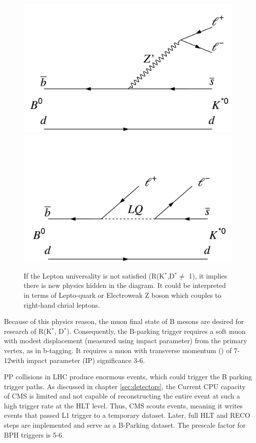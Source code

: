 \begin{figure}[h!]
  \label{fig:LU2}
  \centering
  \includegraphics[width=0.57\linewidth]{figs/Fig1c.png}
  \includegraphics[width=0.57\linewidth]{figs/Fig1d.png}
	\caption{If the Lepton universality is not satisfied (R(K$^{*}$,D$^{*} \neq$ 1), it implies there is new physics hidden in the diagram. It could be interpreted in terms of Lepto-quark or Electroweak Z boson which couples to right-hand chrial leptons.\cite{Lep:2017aai}}
\end{figure}
Because of this physics reason, the muon final state of B mesons are desired for research of R(K$^{*}$, D$^{*}$).
Consequently, the B-parking trigger requires a soft muon with modest displacement (measured using impact parameter) from the primary vertex, as in b-tagging.
It requires a muon with transverse momentum (\pt) of 7-12\GeV with impact parameter (IP) significance 3-6.

PP collisions in LHC produce enormous events, which could trigger the B parking trigger paths.
 As discussed in chapter \ref{sec:detectors}, the Current CPU capacity of CMS is limited and not capable of reconstructing the entire event at such a high trigger rate at the HLT level.
Thus, CMS scouts events, meaning it writes events that passed L1 trigger to a temporary dataset. 
Later, full HLT and RECO steps are implemented and serve as a B-Parking dataset.
The prescale factor for BPH triggers is 5-6.

